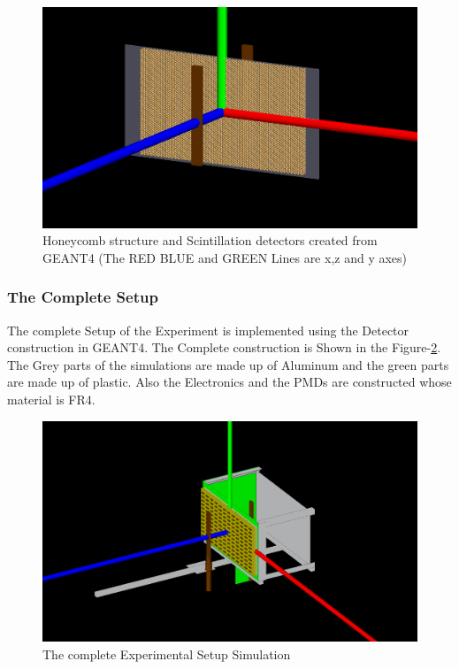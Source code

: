 \documentclass{article}
\begin{document}
\begin{multicols}{2}
\begin{figure}[H]
    \centering	
     \includegraphics[width=\columnwidth]{honeycomb1.png}
     \caption{Honeycomb structure and Scintillation detectors created from GEANT4 (The RED BLUE and GREEN Lines are x,z and y axes)}
     \label{honeycomb1}
\end{figure}



\subsubsection{The Complete Setup}

The complete Setup of the Experiment is implemented using the Detector
construction in GEANT4. The Complete construction is Shown in the 
Figure-\ref{combsetup}. The Grey parts of the simulations are made up
of Aluminum and the green parts are made up of plastic. Also the Electronics and
the PMDs are constructed whose material is FR4.

\begin{figure}[H]
    \centering	
     \includegraphics[width=\columnwidth]{combsetup.png}
     \caption{The complete Experimental Setup Simulation}
     \label{combsetup}
\end{figure}





\end{multicols}
\end{document}
